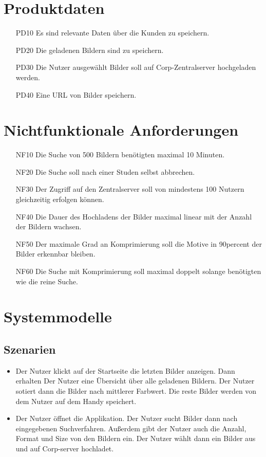 \documentclass[parskip=full]{scrartcl}
\begin{document}
\section{Produktdaten}
\begin{itemize}[nosep]
	\item[PD10] Es sind relevante Daten über die Kunden zu speichern.
	\item[PD20] Die geladenen Bildern sind zu speichern.
	\item[PD30] Die Nutzer ausgewählt Bilder soll auf Corp-Zentralserver hochgeladen werden.
	\item[PD40] Eine URL von Bilder speichern.
\end{itemize}

\section{Nichtfunktionale Anforderungen}
\begin{itemize}[nosep]
	\item[NF10] Die Suche von 500 Bildern benötigten maximal 10 Minuten.
	\item[NF20] Die Suche soll nach einer Studen selbst abbrechen.
	\item[NF30] Der Zugriff auf den Zentralserver soll von mindestens 100 Nutzern gleichzeitig erfolgen können.
	\item[NF40] Die Dauer des Hochladens der Bilder maximal linear mit der Anzahl der Bildern wachsen.
	\item[NF50] Der maximale Grad an Komprimierung soll die Motive in 90percent der Bilder erkennbar bleiben.
	\item[NF60] Die Suche mit Komprimierung soll maximal doppelt solange benötigten wie die reine Suche.   
\end{itemize}

\section{Systemmodelle}

\subsection{Szenarien}
\begin{itemize}[nosep]
	\item Der Nutzer klickt auf der Startseite die letzten Bilder anzeigen. 
	Dann erhalten Der Nutzer eine Übersicht über alle geladenen Bildern.
	Der Nutzer sotiert dann die Bilder nach mittlerer Farbwert. 
	Die reste Bilder werden von dem Nutzer auf dem Handy speichert.

	\item Der Nutzer öffnet die Applikation.
	Der Nutzer sucht Bilder dann nach eingegebenen Suchverfahren.
	Außerdem gibt der Nutzer auch die Anzahl, Format und Size von den Bildern ein.
	Der Nutzer wählt dann ein Bilder aus und auf Corp-server hochladet.
\end{itemize}
	
\end{document}
